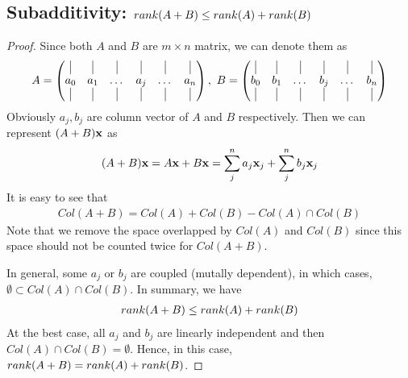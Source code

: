 \documentclass[11pt,a4paper]{report}
\begin{document}
\subsection{Subadditivity: $rank(A+B) \leq rank(A) + rank(B)$}
\begin{proof} 
    Since both $A$ and $B$ are $m\times n$ matrix, we can denote them as 
    \begin{align}
        A = 
        \begin{pmatrix}
            \vrule & \vrule & \vrule & \vrule & \vrule& \vrule \\
            a_0 & a_1 & \dots & a_j & \dots & a_n \\
            \vrule & \vrule & \vrule & \vrule & \vrule& \vrule 
        \end{pmatrix}
        ,\
        B = 
        \begin{pmatrix}
            \vrule & \vrule & \vrule & \vrule & \vrule& \vrule \\
            b_0 & b_1 & \dots & b_j & \dots & b_n \\
            \vrule & \vrule & \vrule & \vrule & \vrule& \vrule 
        \end{pmatrix}
    \end{align}
    Obviously $a_j, b_j$ are column vector of $A$ and $B$ respectively. 
    Then we can represent $(A+B)\mathbf{x}$ as 
    \begin{align}
        (A+B)\mathbf{x} = A\mathbf{x} + B\mathbf{x} = \sum_j^n a_j \mathbf{x}_j + \sum_j^n b_j \mathbf{x}_j
    \end{align}
    It is easy to see that 
    \begin{align}
        Col(A+B) = Col(A) + Col(B) - Col(A) \cap Col(B)
    \end{align}
    Note that we remove the space overlapped by $Col(A)$ and $Col(B)$ since
    this space should not be counted twice for $Col(A+B)$.

    In general, some $a_j$ or $b_j$ are coupled (mutally dependent), in which
    cases, $ \emptyset \subset Col(A) \cap Col(B)$. 
    In summary, we have 
    \begin{align}
        rank(A+B) \leq rank(A) + rank(B)
    \end{align}
    At the best case, all $a_j$ and $b_j$ are linearly independent and then
    $Col(A) \cap Col(B) = \emptyset$. Hence, in this case, $rank(A+B) = rank(A) +
    rank(B)$.
\end{proof}
\end{document}
